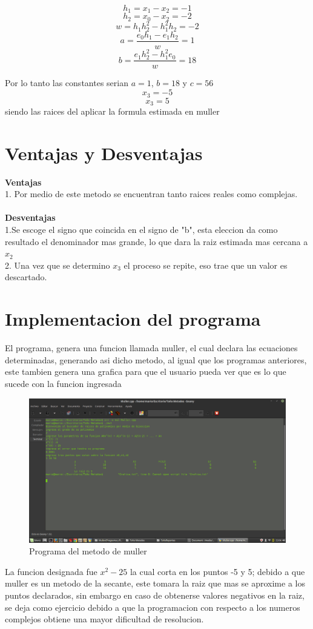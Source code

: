 \documentclass{article}
\begin{document}
\begin{multicols}{2}
$$h_{1}=x_{1}-x_{2}=-1$$
$$h_{2}=x_{0}-x_{2}=-2$$
$$w=h_{1}h_{2}^{2}-h_{1}^{2}h_{2}=-2$$
$$a=\frac{e_{0}h_{1}-e_{1}h_{2}}{w}=1$$
$$b=\frac{e_{1}h_{2}^{2}-h_{1}^{2}e_{0}}{w}=18$$

Por lo tanto las constantes serian $a=1$, $b=18$ y $c=56$
$$x_{3}=-5$$
$$x_{3}=5$$
siendo las raices del aplicar la formula estimada en muller

\section{Ventajas y Desventajas}
\label{sec:Ven}
\textbf{Ventajas}
\\
1. Por medio de este metodo se encuentran tanto raices reales como complejas.
\\
\\
\textbf{Desventajas}
\\
1.Se escoge el signo que coincida en el signo de "b", esta eleccion da como resultado el denominador mas grande, lo que dara la raiz estimada mas cercana a $x_{2}$
\\
2. Una vez que se determino $x_{3}$ el proceso se repite, eso trae que un valor es descartado.




\section{Implementacion del programa}
\label{sec:Imp}
El programa, genera una funcion llamada muller, el cual declara las ecuaciones determinadas, generando asi dicho metodo, al igual que los programas anteriores, este tambien genera una grafica para que el usuario pueda ver que es lo que sucede con la funcion ingresada
\begin{figure}[H]
\centering
\includegraphics[scale=.125]{Muller.png}
\caption{Programa del metodo de muller}
\end{figure}
La funcion designada fue $x^{2}-25$ la cual corta en los puntos -5 y 5; debido a que muller es un metodo de la secante, este tomara la raiz que mas se aproxime a los puntos declarados, sin embargo en caso de obtenerse valores negativos en la raiz, se deja como ejercicio debido a que la programacion con respecto a los numeros complejos obtiene una mayor dificultad de resolucion.



\end{multicols}
\end{document}
